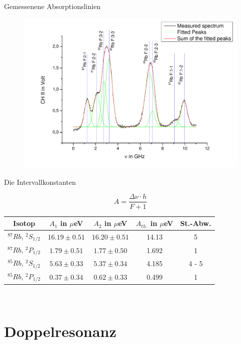 \documentclass{beamer}
\begin{document}
\begin{frame}[plain]{Gemessenene Absorptionslinien}
	\begin{figure}[H]
	\centering \includegraphics[width=1.1\textwidth]{Bilder/HFSAusw.pdf}
	\end{figure}
\end{frame}

\begin{frame}{Die Intervallkonstanten}

$$A = \frac{\Delta\nu\cdot h}{F+1}$$

\begin{center}
\begin{tabular}[H]{| c | c c c c |} \hline
Isotop & $A_1$ in $\mu$eV & $A_2$ in $\mu$eV & $A_{th.}$ in $\mu$eV & St.-Abw.\\ \hline
$^{87}Rb$, $^2S_{1/2}$ & $16.19 \pm 0.51$ & $16.20 \pm 0.51$ & 14.13  & 5 \\
$^{87}Rb$, $^2P_{1/2}$ & $1.79 \pm 0.51$ &  $1.77 \pm 0.50$ & 1.692   & 1 \\
$^{85}Rb$, $^2S_{1/2}$ & $5.63 \pm 0.33$ &  $5.37 \pm 0.34$ & 4.185   & 4 - 5 \\
$^{85}Rb$, $^2P_{1/2}$ & $0.37 \pm 0.34$ &  $0.62 \pm 0.33$ & 0.499   & 1 \\ \hline
\end{tabular}\\
\end{center}

\end{frame}


\section{Doppelresonanz}
\begin{frame}
\begin{center}
\end{center}
\end{frame}
\end{document}
